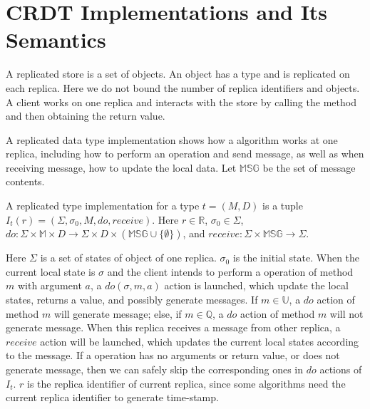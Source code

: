 
\section{CRDT Implementations and Its Semantics}
\label{sec:CRDT implementations and its semantics}

A replicated store is a set of objects. An object has a type and is replicated on each replica. Here we do not bound the number of replica identifiers and objects. A client works on one replica and interacts with the store by calling the method and then obtaining the return value.

A replicated data type implementation shows how a algorithm works at one replica, including how to perform an operation and send message, as well as when receiving message, how to update the local data. Let $\mathbb{MSG}$ be the set of message contents.

\begin{definition}
\label{definition:replicated type implementation}
A replicated type implementation for a type $t = (M,D)$ is a tuple $I_t(r) = (\Sigma, \sigma_0, M, \mathit{do},\mathit{receive})$. Here $r \in \mathbb{R}$, $\sigma_0 \in \Sigma$, $\mathit{do}:\Sigma \times \mathbb{M} \times D \rightarrow \Sigma \times D \times (\mathbb{MSG} \cup \{ \emptyset \} )$, and $\mathit{receive}: \Sigma \times \mathbb{MSG} \rightarrow \Sigma$.
\end{definition}

Here $\Sigma$ is a set of states of object of one replica. $\sigma_0$ is the initial state. When the current local state is $\sigma$ and the client intends to perform a operation of method $m$ with argument $a$, a $\mathit{do}(\sigma,m,a)$ action is launched, which update the local states, returns a value, and possibly generate messages. If $m \in \mathbb{U}$, a $\mathit{do}$ action of method $m$ will generate message; else, if $m \in \mathbb{Q}$, a $\mathit{do}$ action of method $m$ will not generate message. When this replica receives a message from other replica, a $\mathit{receive}$ action will be launched, which updates the current local states according to the message. If a operation has no arguments or return value, or does not generate message, then we can safely skip the corresponding ones in $\mathit{do}$ actions of $I_t$. $r$ is the replica identifier of current replica, since some algorithms need the current replica identifier to generate time-stamp.

